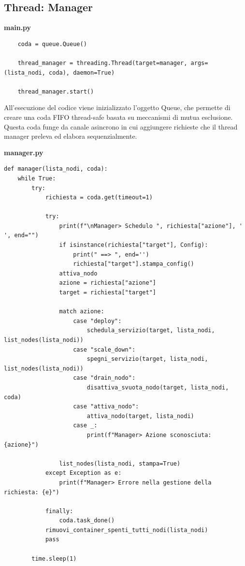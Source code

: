 \documentclass[12pt,a4paper]{article}
\begin{document}
\subsection{Thread: Manager}
\begin{center}
\textbf{main.py}
\end{center}
\begin{verbatim}
    coda = queue.Queue()

    thread_manager = threading.Thread(target=manager, args=(lista_nodi, coda), daemon=True)

    thread_manager.start()
\end{verbatim}
All'esecuzione del codice viene inizializzato l'oggetto Queue, che permette di creare una coda FIFO thread-safe basata su meccanismi di mutua esclusione. Questa coda funge da canale asincrono in cui aggiungere richieste che il thread manager preleva ed elabora sequenzialmente.
\begin{center}
\textbf{manager.py}
\end{center}
\begin{verbatim}
def manager(lista_nodi, coda):
    while True:
        try:
            richiesta = coda.get(timeout=1)
            
            try:
                print(f"\nManager> Schedulo ", richiesta["azione"], ' ', end="")
                if isinstance(richiesta["target"], Config):
                    print(" ==> ", end='')
                    richiesta["target"].stampa_config()
                attiva_nodo
                azione = richiesta["azione"]
                target = richiesta["target"]
                
                match azione:
                    case "deploy":
                        schedula_servizio(target, lista_nodi, list_nodes(lista_nodi))
                    case "scale_down":
                        spegni_servizio(target, lista_nodi, list_nodes(lista_nodi))
                    case "drain_nodo":
                        disattiva_svuota_nodo(target, lista_nodi, coda)
                    case "attiva_nodo":
                        attiva_nodo(target, lista_nodi)
                    case _:
                        print(f"Manager> Azione sconosciuta: {azione}")
                
                list_nodes(lista_nodi, stampa=True)
            except Exception as e:
                print(f"Manager> Errore nella gestione della richiesta: {e}")
                
            finally:
                coda.task_done()
            rimuovi_container_spenti_tutti_nodi(lista_nodi)
            pass
            
        time.sleep(1)
\end{verbatim}
\end{document}
